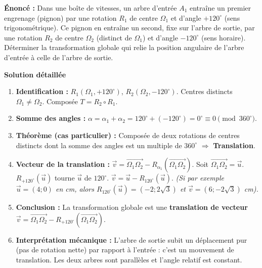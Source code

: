 \documentclass[11pt]{article}
\begin{document}
\begin{exoresolu}
\textbf{Énoncé :} Dans une boîte de vitesses, un arbre d'entrée $A_1$ entraîne un premier engrenage (pignon) par une rotation $R_1$ de centre $\Omega_1$ et d'angle $+120^\circ$ (sens trigonométrique). Ce pignon en entraîne un second, fixe sur l'arbre de sortie, par une rotation $R_2$ de centre $\Omega_2$ (distinct de $\Omega_1$) et d'angle $-120^\circ$ (sens horaire). Déterminer la transformation globale qui relie la position angulaire de l'arbre d'entrée à celle de l'arbre de sortie.

\textbf{Solution détaillée}
\begin{enumerate}
    \item \textbf{Identification :} $R_1(\Omega_1, +120^\circ)$, $R_2(\Omega_2, -120^\circ)$. Centres distincts $\Omega_1 \neq \Omega_2$. Composée $T = R_2 \circ R_1$.
    \item \textbf{Somme des angles :} $\alpha = \alpha_1 + \alpha_2 = 120^\circ + (-120^\circ) = 0^\circ \equiv 0 \pmod{360^\circ}$.
    \item \textbf{Théorème (cas particulier) :} Composée de deux rotations de centres distincts dont la somme des angles est un multiple de $360^\circ$ $\Rightarrow$ \textbf{Translation}.
    \item \textbf{Vecteur de la translation :} $\vec{v} = \overrightarrow{\Omega_1\Omega_2} - R_{\alpha_1}(\overrightarrow{\Omega_1\Omega_2})$.
        Soit $\overrightarrow{\Omega_1\Omega_2} = \vec{u}$. $R_{+120^\circ}(\vec{u})$ tourne $\vec{u}$ de $120^\circ$.
        $\vec{v} = \vec{u} - R_{120^\circ}(\vec{u})$.
        \textit{(Si par exemple $\vec{u} = (4;0)$ en cm, alors $R_{120^\circ}(\vec{u}) = (-2; 2\sqrt{3})$ et $\vec{v} = (6; -2\sqrt{3})$ cm).}
    \item \textbf{Conclusion :} La transformation globale est une \textbf{translation de vecteur $\vec{v} = \overrightarrow{\Omega_1\Omega_2} - R_{+120^\circ}(\overrightarrow{\Omega_1\Omega_2})$}.
    \item \textbf{Interprétation mécanique :} L'arbre de sortie subit un déplacement pur (pas de rotation nette) par rapport à l'entrée : c'est un mouvement de translation. Les deux arbres sont parallèles et l'angle relatif est constant.
\end{enumerate}
\end{exoresolu}
\end{document}
